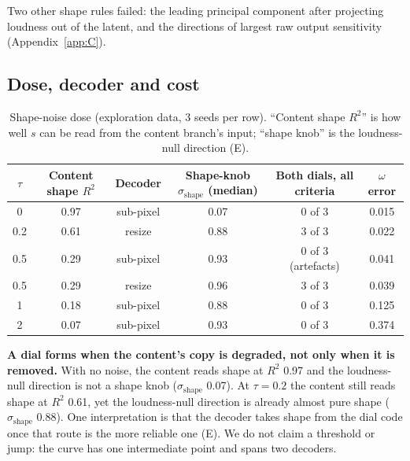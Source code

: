 \documentclass[10pt]{article}
\begin{document}
Two other shape rules failed: the leading principal component after projecting loudness out of the latent, and the directions of largest raw output sensitivity (Appendix~\ref{app:C}).

\subsection{Dose, decoder and cost}\label{sec:6.4}

\begin{table}[htbp]
\centering
\small
\caption{Shape-noise dose (exploration data, 3 seeds per row). ``Content shape $R^2$'' is how well $s$ can be read from the content branch's input; ``shape knob'' is the loudness-null direction (E).}
\label{tab:4}
\begin{tabularx}{\linewidth}{cccccc}
\toprule
$\tau$ & Content shape $R^2$ & Decoder & Shape-knob $\sigma_{\mathrm{shape}}$ (median) & Both dials, all criteria & $\omega$ error \\
\midrule
0 & 0.97 & sub-pixel & 0.07 & 0 of 3 & 0.015 \\
0.2 & 0.61 & resize & 0.88 & 3 of 3 & 0.022 \\
0.5 & 0.29 & sub-pixel & 0.93 & 0 of 3 (artefacts) & 0.041 \\
0.5 & 0.29 & resize & 0.96 & 3 of 3 & 0.039 \\
1 & 0.18 & sub-pixel & 0.88 & 0 of 3 & 0.125 \\
2 & 0.07 & sub-pixel & 0.93 & 0 of 3 & 0.374 \\
\bottomrule
\end{tabularx}
\end{table}

\textbf{A dial forms when the content's copy is degraded, not only when it is removed.} With no noise, the content reads shape at $R^2$ 0.97 and the loudness-null direction is not a shape knob ($\sigma_{\mathrm{shape}}$ 0.07). At $\tau = 0.2$ the content still reads shape at $R^2$ 0.61, yet the loudness-null direction is already almost pure shape ($\sigma_{\mathrm{shape}}$ 0.88). One interpretation is that the decoder takes shape from the dial code once that route is the more reliable one (E). We do not claim a threshold or jump: the curve has one intermediate point and spans two decoders.
\end{document}
